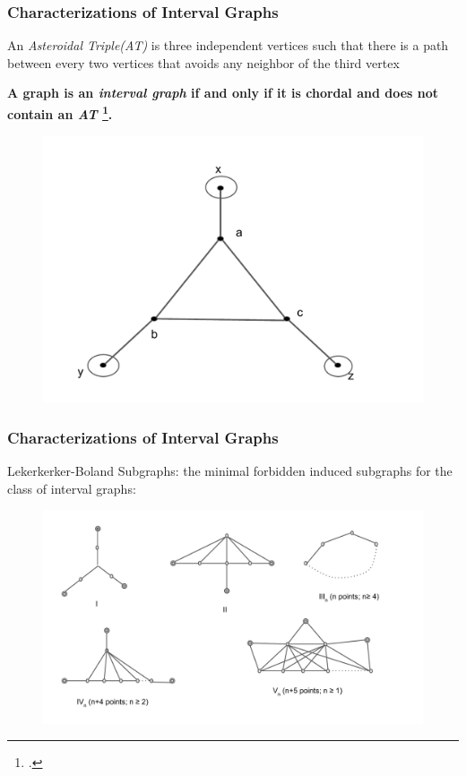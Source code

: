 \documentclass{beamer}
\begin{document}
\begin{frame}
	\frametitle{Characterizations of Interval Graphs}
	An \emph{Asteroidal Triple(AT)} is three independent vertices such that there is a path between every two vertices that avoids any neighbor of the third vertex
    
    \vspace{0.1in}
    
    \textbf{
	A graph is an \emph{interval graph} if and only if it is chordal and does not contain an \emph{AT} \footcite{lekkerkerker1962representation}.}
	
	\begin{figure}
		\includegraphics[height = 0.4\textheight]{figures/at.pdf}
	\end{figure}


\end{frame}

\begin{frame}
	\frametitle{Characterizations of Interval Graphs}
    Lekerkerker-Boland Subgraphs: the minimal forbidden induced subgraphs for the class of interval graphs:
    \begin{figure}
		\includegraphics[width = 1.0\textwidth]{figures/lb_subgraph.pdf}
	\end{figure}
\vspace{0.2in}

\end{frame}
\end{document}
